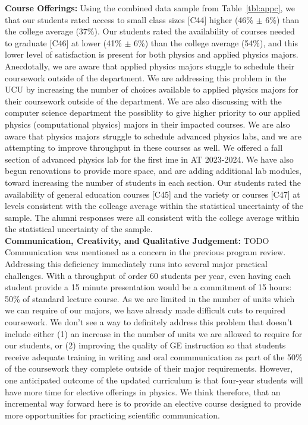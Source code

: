 \documentclass[12pt]{article}
\begin{document}
\noindent
{\bf Course Offerings:} Using the combined data sample from
Table~\ref{tbl:appc}, we that our students rated access to small class
sizes [C44] higher (46\% $\pm$ 6\%) than the college average ($37\%$).
Our students rated the availability of courses needed to graduate
[C46] at lower (41\% $\pm$ 6\%) than the college average (54\%), and
this lower level of satisfaction is present for both physics and
applied physics majors.  Anecdotally, we are aware that applied
physics majors stuggle to schedule their coursework outside of the
department.  We are addressing this problem in the UCU by increasing
the number of choices available to applied physics majors for their
coursework outside of the department.  We are also discussing with the
computer science department the possiblity to give higher priority to
our applied physics (computational physics) majors in their impacted
courses.  We are also aware that physics majors struggle to schedule
advanced physics labs, and we are attempting to improve throughput in
these courses as well.  We offered a fall section of advanced physics
lab for the first ime in AT 2023-2024.  We have also begun renovations
to provide more space, and are adding additional lab modules, toward
increasing the number of students in each section.  Our students rated
the availability of general education courses [C45] and the variety or
courses [C47] at levels consistent with the colleage average within
the statistical uncertainty of the sample.  The alumni responses were
all consistent with the college average within the statistical
uncertainty of the sample.\\[3pt]

\noindent
{\bf Communication, Creativity, and Qualitative Judgement:} {\color{red}TODO}
Communication was mentioned as a concern in the previous program
review.  Addressing this deficiency immediately runs into several
major practical challenges.  With a throughput of order 60 students
per year, even having each student provide a 15 minute presentation
would be a commitment of 15 hours: 50\% of standard lecture course.
As we are limited in the number of units which we can require of our
majors, we have already made difficult cuts to required coursework.
We don't see a way to definitely address this problem that doesn't
include either (1) an increase in the number of units we are allowed
to require for our students, or (2) improving the quality of GE
instruction so that students receive adequate training in writing and
oral commmunication as part of the 50\% of the coursework they
complete outside of their major requirements.  However, one
anticipated outcome of the updated curriculum is that four-year
students will have more time for elective offerings in physics.  We
think therefore, that an incremental way forward here is to provide an
elective course designed to provide more opportunities for practicing
scientific communication.
\end{document}

